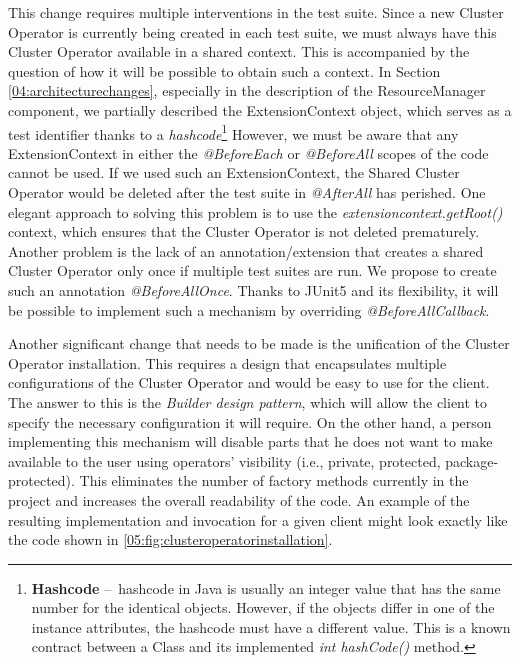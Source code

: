 This change requires multiple interventions in the test suite.
Since a new Cluster Operator is currently being created in each test suite, we must always have this Cluster Operator available in a shared context.
This is accompanied by the question of how it will be possible to obtain such a context.
In Section \ref{04:architecturechanges}, especially in the description of the ResourceManager component, we partially described the ExtensionContext object, which serves as a test identifier thanks to a \emph{hashcode}\footnote{\textbf{Hashcode} \---\ hashcode in Java is usually an integer value that has the same number for the identical objects. However, if the objects differ in one of the instance attributes, the hashcode must have a different value. This is a known contract between a Class and its implemented \emph{int hashCode()} method.}  However, we must be aware that any ExtensionContext in either the \emph{@BeforeEach} or \emph{@BeforeAll} scopes of the code cannot be used. If we used such an ExtensionContext, the Shared Cluster Operator would be deleted after the test suite in \emph{@AfterAll} has perished. One elegant approach to solving this problem is to use the \emph{extensioncontext.getRoot()} context, which ensures that the Cluster Operator is not deleted prematurely.
Another problem is the lack of an annotation/extension that creates a shared Cluster Operator only once if multiple test suites are run.
We propose to create such an annotation \emph{@BeforeAllOnce}.
Thanks to JUnit5 and its flexibility, it will be possible to implement such a mechanism by overriding \emph{@BeforeAllCallback}.

Another significant change that needs to be made is the unification of the Cluster Operator installation.
This requires a design that encapsulates multiple configurations of the Cluster Operator and would be easy to use for the client.
The answer to this is the \emph{Builder design pattern}, which will allow the client to specify the necessary configuration it will require.
On the other hand, a person implementing this mechanism will disable parts that he does not want to make available to the user using operators' visibility (i.e., private, protected, package-protected).
This eliminates the number of factory methods currently in the project and increases the overall readability of the code.
An example of the resulting implementation and invocation for a given client might look exactly like the code shown in \ref{05:fig:clusteroperatorinstallation}.

